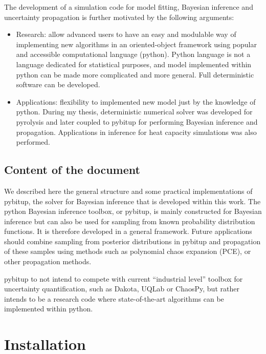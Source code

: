 \documentclass[a4paper,11pt]{article}
\begin{document}
The development of a simulation code for model fitting, Bayesian inference and uncertainty propagation is further motivated by the following arguments: 
\begin{itemize}
\item Research: allow advanced users to have an easy and modulable way of implementing new algorithms in an oriented-object framework using popular and accessible computational language (python). Python language is not a language dedicated for statistical purposes, and model implemented within python can be made more complicated and more general. Full deterministic software can be developed. 
\item Applications: flexibility to implemented new model just by the knowledge of python. During my thesis, deterministic numerical solver was developed for pyrolysis and later coupled to pybitup for performing Bayesian inference and propagation. Applications in inference for heat capacity simulations was also performed.   
\end{itemize}


 
\subsection{Content of the document} 

We described here the general structure and some practical implementations of pybitup, the solver for Bayesian inference that is developed within this work. The python Bayesian inference toolbox, or pybitup, is mainly constructed for Bayesian inference but can also be used for sampling from known probability distribution functions. It is therefore developed in a general framework. Future applications should combine sampling from posterior distributions in pybitup and propagation of these samples using methods such as polynomial chaos expansion (PCE), or other propagation methods. 

pybitup to not intend to compete with current ``industrial level'' toolbox for uncertainty quantification, such as Dakota, UQLab or ChaosPy, but rather intends to be a research code where state-of-the-art algorithms can be implemented within python.



\section{Installation}
\end{document}
